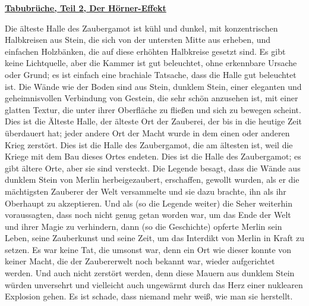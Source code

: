

\hypertarget{tabubruxfcche-teil-2-der-huxf6rner-effekt}{%

\textbf{\uline{Tabubrüche, Teil 2, Der Hörner-Effekt}}

Die älteste Halle des Zaubergamot ist kühl und dunkel, mit konzentrischen Halbkreisen aus Stein, die sich von der untersten Mitte aus erheben, und einfachen Holzbänken, die auf diese erhöhten Halbkreise gesetzt sind. Es gibt keine Lichtquelle, aber die Kammer ist gut beleuchtet, ohne erkennbare Ursache oder Grund; es ist einfach eine brachiale Tatsache, dass die Halle gut beleuchtet ist. Die Wände wie der Boden sind aus Stein, dunklem Stein, einer eleganten und geheimnisvollen Verbindung von Gestein, die sehr schön anzusehen ist, mit einer glatten Textur, die unter ihrer Oberfläche zu fließen und sich zu bewegen scheint. Dies ist die Älteste Halle, der älteste Ort der Zauberei, der bis in die heutige Zeit überdauert hat; jeder andere Ort der Macht wurde in dem einen oder anderen Krieg zerstört. Dies ist die Halle des Zaubergamot, die am ältesten ist, weil die Kriege mit dem Bau dieses Ortes endeten. Dies ist die Halle des Zaubergamot; es gibt ältere Orte, aber sie sind versteckt. Die Legende besagt, dass die Wände aus dunklem Stein von Merlin herbeigezaubert, erschaffen, gewollt wurden, als er die mächtigsten Zauberer der Welt versammelte und sie dazu brachte, ihn als ihr Oberhaupt zu akzeptieren. Und als (so die Legende weiter) die Seher weiterhin voraussagten, dass noch nicht genug getan worden war, um das Ende der Welt und ihrer Magie zu verhindern, dann (so die Geschichte) opferte Merlin sein Leben, seine Zauberkunst und seine Zeit, um das Interdikt von Merlin in Kraft zu setzen. Es war keine Tat, die umsonst war, denn ein Ort wie dieser konnte von keiner Macht, die der Zaubererwelt noch bekannt war, wieder aufgerichtet werden. Und auch nicht zerstört werden, denn diese Mauern aus dunklem Stein würden unversehrt und vielleicht auch ungewärmt durch das Herz einer nuklearen Explosion gehen. Es ist schade, dass niemand mehr weiß, wie man sie herstellt.

}
